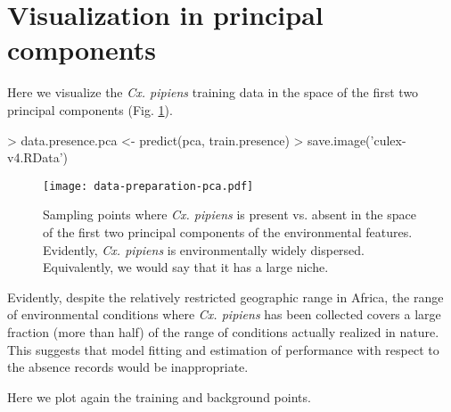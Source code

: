 \documentclass[10pt]{article}
\renewenvironment{Schunk}{\vspace{\topsep}}{\vspace{\topsep}}
\begin{document}
\section{Visualization in principal components}

Here we visualize the \emph{Cx. pipiens} training data in the space of the first two principal components (Fig. \ref{fig:pca}).

\begin{Schunk}
\begin{Sinput}
> data.presence.pca <- predict(pca, train.presence)
> save.image('culex-v4.RData')
\end{Sinput}
\end{Schunk}

\begin{Schunk}
\end{Schunk}

\begin{figure}
  \begin{center}
    \texttt{[image: data-preparation-pca.pdf]}
    \caption{Sampling points where \emph{Cx. pipiens} is present vs. absent in the space of the first two principal components of the environmental features. Evidently, \emph{Cx. pipiens} is environmentally widely dispersed. Equivalently, we would say that it has a large niche.}  
    \label{fig:pca}
  \end{center}
\end{figure}

Evidently, despite the relatively restricted geographic range in Africa, the range of environmental conditions where \emph{Cx. pipiens} has been collected covers a large fraction (more than half) of the range of conditions actually realized in nature. This suggests that model fitting and estimation of performance with respect to the absence records would be inappropriate.

Here we plot again the training and background points.
\end{document}
